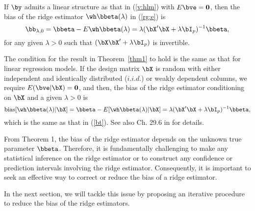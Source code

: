 \begin{theorem}\label{thm1}
If $\by$ admits a linear structure as that in (\ref{v:hlm}) with $E\bve={\bf 0}$, then the bias of the ridge estimator $\wh\bbeta(\lambda)$ in (\ref{rg:e}) is
\begin{equation}\label{bt}
    \bb_{\lambda,0}=\bbeta-E\wh\bbeta(\lambda)=\lambda (\bX'\bX+\lambda\bI_p)^{-1}\bbeta,
\end{equation}
for any given $\lambda>0$ such that $(\bX\bX'+\lambda\bI_p)$ is invertible.
\end{theorem}
\begin{remark}
    The condition for the result in Theorem~\ref{thm1} to hold is the same as that for linear regression models. If the design matrix $\bX$ is random with either independent and identically distributed  ($i.i.d.$) or weakly dependent columns, we require $E(\bve|\bX)={\bf 0}$, and then, the bias of the ridge estimator conditioning on $\bX$ and a given $\lambda>0$ is
    \[\text{bias}[\wh\bbeta(\lambda)|\bX]=\bbeta-E[\wh\bbeta(\lambda)|\bX]=\lambda (\bX'\bX+\lambda\bI_p)^{-1}\bbeta,\]
    which is the same as that in (\ref{bt}). See also Ch. 29.6 in \cite{hansen2022econometrics} for details.
\end{remark}

From Theorem 1, the bias of the ridge estimator depends on the unknown true parameter $\bbeta$. Therefore, it is fundamentally challenging to make any statistical inference on the ridge estimator or to construct any confidence or prediction intervals involving the ridge estimator. Consequently, it is important to seek an effective way to correct or reduce the bias of a ridge estimator.

 In the next section, we will tackle this issue by proposing an iterative procedure to reduce the bias of the ridge estimators.






